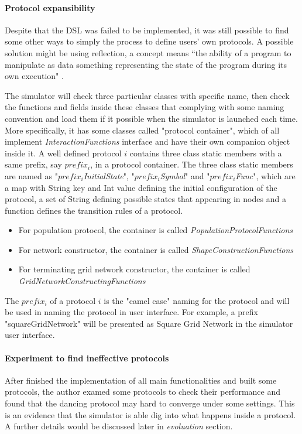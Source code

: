 \paragraph{Protocol expansibility}
Despite that the DSL was failed to be implemented, it was still possible to find some other ways to simply the process to define users' own protocols.
A possible solution might be using reflection, a concept means “the ability of a program to manipulate as data something representing the state of the
program during its own execution" \cite{reflection96}.
\par\noindent
The simulator will check three particular classes with specific name,
then check the functions and fields inside these classes that complying with some naming convention and load them if it possible when the simulator is launched each time.
More specifically, it has some classes called "protocol container", which of all implement \textit{InteractionFunctions} interface
and have their own companion object inside it. A well defined protocol $i$ contains three class static members with a same prefix, say $prefix_{i}$, in a protocol container.
The three class static members are named as "\textit{$prefix_{i}$InitialState}", "\textit{$prefix_{i}$Symbol}" and "\textit{$prefix_{i}$Func}", which are a map with String key and Int value defining the
initial configuration of the protocol, a set of String defining possible states that appearing in nodes and a function defines the transition rules of a protocol.
\begin{itemize}
  \item For population protocol, the container is called \textit{PopulationProtocolFunctions}
  \item For network constructor, the container is called \textit{ShapeConstructionFunctions}
  \item For terminating grid network constructor, the container is called \textit{GridNetworkConstructingFunctions}
\end{itemize}
\par\noindent
The $prefix_{i}$ of a protocol $i$ is the "camel case" naming for the protocol and will be used in naming the protocol in user interface. For example,
a prefix "squareGridNetwork" will be presented as Square Grid Network in the simulator user interface.

\paragraph{Experiment to find ineffective protocols}
After finished the implementation of all main functionalities and built some protocols, the author examed some protocols to check their performance
and found that the dancing protocol may hard to converge under some settings. This is an evidence that the simulator is able dig into what happens inside
a protocol. A further details would be discussed later in \textit{evoluation} section.
